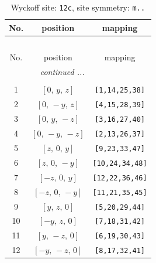 \documentclass[fleqn,8pt]{jsarticle}
\begin{document}
\begin{longtable}{ccc}
\caption{Wyckoff site: {\tt 12c}, site symmetry: {\tt m..}}
 \\
 \hline \hline
No. & position & mapping \\ \hline \endfirsthead

\multicolumn{2}{l}{\tablename\ \thetable{}} \\
 \hline \hline
No. & position & mapping \\ \hline \endhead

 \hline \hline
\multicolumn{2}{r}{\footnotesize\it continued ...} \\ \endfoot

 \hline \hline
\multicolumn{2}{r}{} \\ \endlastfoot

1 & $\left[ 0,\, y,\, z \right]$ & {\tt [1,14,25,38]} \\ \hline
2 & $\left[ 0,\, - y,\, z \right]$ & {\tt [4,15,28,39]} \\ \hline
3 & $\left[ 0,\, y,\, - z \right]$ & {\tt [3,16,27,40]} \\ \hline
4 & $\left[ 0,\, - y,\, - z \right]$ & {\tt [2,13,26,37]} \\ \hline
5 & $\left[ z,\, 0,\, y \right]$ & {\tt [9,23,33,47]} \\ \hline
6 & $\left[ z,\, 0,\, - y \right]$ & {\tt [10,24,34,48]} \\ \hline
7 & $\left[ - z,\, 0,\, y \right]$ & {\tt [12,22,36,46]} \\ \hline
8 & $\left[ - z,\, 0,\, - y \right]$ & {\tt [11,21,35,45]} \\ \hline
9 & $\left[ y,\, z,\, 0 \right]$ & {\tt [5,20,29,44]} \\ \hline
10 & $\left[ - y,\, z,\, 0 \right]$ & {\tt [7,18,31,42]} \\ \hline
11 & $\left[ y,\, - z,\, 0 \right]$ & {\tt [6,19,30,43]} \\ \hline
12 & $\left[ - y,\, - z,\, 0 \right]$ & {\tt [8,17,32,41]} \\
\end{longtable}
\renewcommand{\arraystretch}{1.2}
\end{document}
